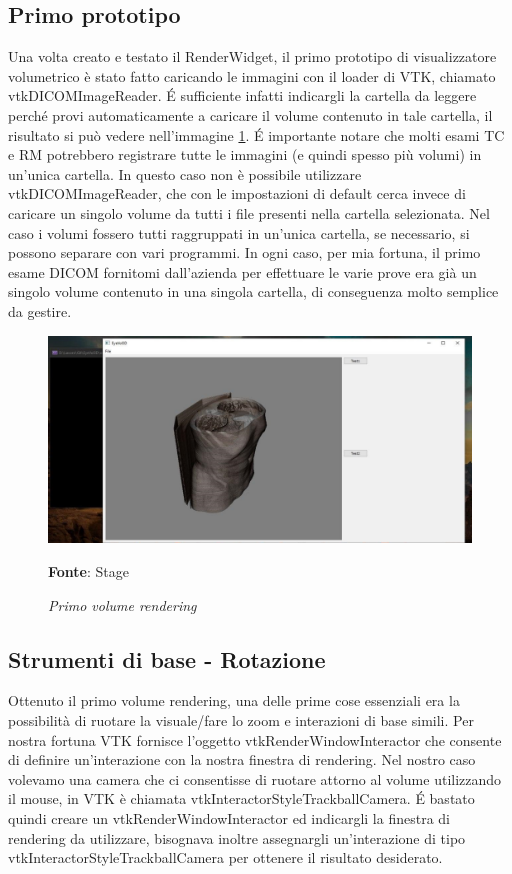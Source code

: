 \subsection{Primo prototipo}
Una volta creato e testato il RenderWidget, il primo prototipo di visualizzatore volumetrico è stato fatto caricando le immagini con il loader di VTK, chiamato vtkDICOMImageReader. \'E sufficiente infatti indicargli la cartella da leggere perché provi automaticamente a caricare il volume contenuto in tale cartella, il risultato si può vedere nell'immagine \ref{fig: firstvolume}. \'E importante notare che molti esami TC e RM potrebbero registrare tutte le immagini (e quindi spesso più volumi) in un'unica cartella. In questo caso non è possibile utilizzare vtkDICOMImageReader, che con le impostazioni di default cerca invece di caricare un singolo volume da tutti i file presenti nella cartella selezionata. Nel caso i volumi fossero tutti raggruppati in un'unica cartella, se necessario, si possono separare con vari programmi. In ogni caso, per mia fortuna, il primo esame DICOM fornitomi dall'azienda per effettuare le varie prove era già un singolo volume contenuto in una singola cartella, di conseguenza molto semplice da gestire.

\begin{figure}[h]
    \centering
    \includegraphics[width=1\textwidth]{immagini/svolgimento/firstvolume.jpg}
    \caption{\textit{Primo volume rendering}}
    \textbf{Fonte}: Stage
    \label{fig: firstvolume}
\end{figure}

\subsection{Strumenti di base - Rotazione}
Ottenuto il primo volume rendering, una delle prime cose essenziali era la possibilità di ruotare la visuale/fare lo zoom e interazioni di base simili. Per nostra fortuna VTK fornisce l'oggetto vtkRenderWindowInteractor che consente di definire un'interazione con la nostra finestra di rendering. Nel nostro caso volevamo una camera che ci consentisse di ruotare attorno al volume utilizzando il mouse, in VTK è chiamata vtkInteractorStyleTrackballCamera. \'E bastato quindi creare un vtkRenderWindowInteractor ed indicargli la finestra di rendering da utilizzare, bisognava inoltre assegnargli un'interazione di tipo vtkInteractorStyleTrackballCamera per ottenere il risultato desiderato.

